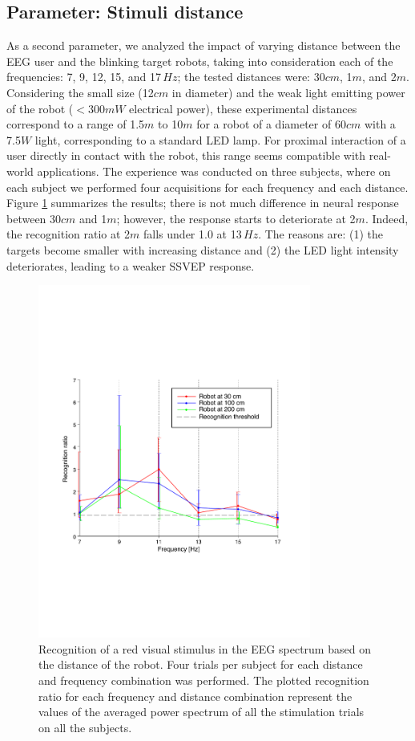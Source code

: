 \documentclass[smallextended]{svjour3}
\begin{document}
\subsection{Parameter: Stimuli distance}
As a second parameter, we analyzed the impact of varying distance between the EEG user and the blinking target robots, taking into consideration each of the frequencies: 7, 9, 12, 15, and 17\,$Hz$; the tested distances were: 30$cm$, 1$m$, and 2$m$. 
Considering the small size (12$cm$ in diameter) and the weak light emitting power of the robot ($< 300mW$ electrical power), these experimental distances correspond to a range of 1.5$m$ to 10$m$ for a robot of a diameter of 60$cm$ with a 7.5$W$ light, corresponding to a standard LED lamp. 
For proximal interaction of a user directly in contact with the robot, this range seems compatible with real-world applications.
The experience was conducted on three subjects, where on each subject we performed four acquisitions for each frequency and each distance. 
Figure \ref{fig:graph-distances} summarizes the results; there is not much difference in neural response between 30$cm$ and 1$m$; however, the response starts to deteriorate at 2$m$. Indeed, the recognition ratio at 2$m$ falls under 1.0 at 13\,$Hz$. 
The reasons are: (1) the targets become smaller with increasing distance and (2) the LED light intensity deteriorates, leading to a weaker SSVEP response.

\begin{figure}
\center
\includegraphics[width=0.8\textwidth]{figures/graph-distances.pdf}
\caption{Recognition of a red visual stimulus in the EEG spectrum based on the distance of the robot. Four trials per subject for each distance and frequency combination was performed. The plotted recognition ratio for each frequency and distance combination represent the values of the averaged power spectrum of all the stimulation trials on all the subjects.}
\label{fig:graph-distances}
\end{figure}
\end{document}
